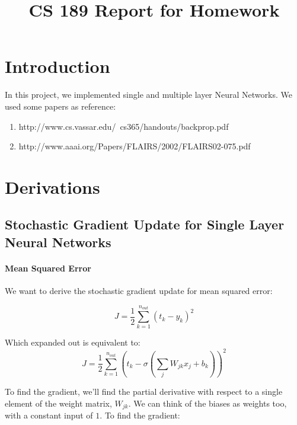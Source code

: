 \documentclass[11pt]{article}
\title{CS 189 Report for Homework \Homework}
\author{\Name}
\begin{document}
\maketitle

\section{Introduction}

In this project, we implemented single and multiple layer Neural Networks. We used some papers as reference:
\begin{enumerate}
\item http://www.cs.vassar.edu/~cs365/handouts/backprop.pdf
\item http://www.aaai.org/Papers/FLAIRS/2002/FLAIRS02-075.pdf
\end{enumerate}

\section{Derivations}

\subsection{Stochastic Gradient Update for Single Layer Neural Networks}

\paragraph{Mean Squared Error} We want to derive the stochastic gradient update for mean squared error:

\[
	J = \frac{1}{2}\sum_{k=1}^{n_{out}}\left( t_k - y_k \right) ^2
\]

Which expanded out is equivalent to:
\[
	J = \frac{1}{2}\sum_{k=1}^{n_{out}}\left( t_k - \sigma \left( \sum_j W_{jk} x_j + b_k \right) \right) ^2
\]

To find the gradient, we'll find the partial derivative with respect to a single element of the weight matrix, $W_{jk}$. We can think of the biases as weights too, with a constant input of $1$. To find the gradient:
\end{document}
